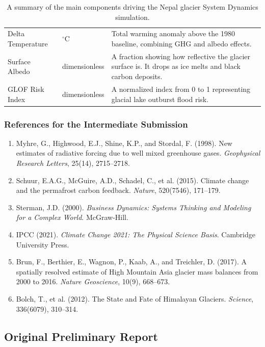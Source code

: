 \documentclass[12pt, a4paper]{article}
\begin{document}
\begin{table}[H]
\begin{tabular}{|p{3.5cm}|p{2cm}|p{9cm}|}
        Delta Temperature & $^\circ$C & Total warming anomaly above the 1980 baseline, combining GHG and albedo effects. \\
        Surface Albedo & dimensionless & A fraction showing how reflective the glacier surface is. It drops as ice melts and black carbon deposits. \\
        GLOF Risk Index & dimensionless & A normalized index from 0 to 1 representing glacial lake outburst flood risk. \\
        \hline
    \end{tabular}
    \caption{A summary of the main components driving the Nepal glacier System Dynamics simulation.}
    \label{tab:variables_appendix}
\end{table}

\subsubsection*{References for the Intermediate Submission}

\begin{enumerate}
    \item Myhre, G., Highwood, E.J., Shine, K.P., and Stordal, F. (1998). New estimates of radiative forcing due to well mixed greenhouse gases. \textit{Geophysical Research Letters}, 25(14), 2715--2718.
    \item Schuur, E.A.G., McGuire, A.D., Schadel, C., et al. (2015). Climate change and the permafrost carbon feedback. \textit{Nature}, 520(7546), 171--179.
    \item Sterman, J.D. (2000). \textit{Business Dynamics: Systems Thinking and Modeling for a Complex World}. McGraw-Hill.
    \item IPCC (2021). \textit{Climate Change 2021: The Physical Science Basis}. Cambridge University Press.
    \item Brun, F., Berthier, E., Wagnon, P., Kaab, A., and Treichler, D. (2017). A spatially resolved estimate of High Mountain Asia glacier mass balances from 2000 to 2016. \textit{Nature Geoscience}, 10(9), 668--673.
    \item Bolch, T., et al. (2012). The State and Fate of Himalayan Glaciers. \textit{Science}, 336(6079), 310--314.
\end{enumerate}

\newpage
\subsection*{Original Preliminary Report}
\end{document}
